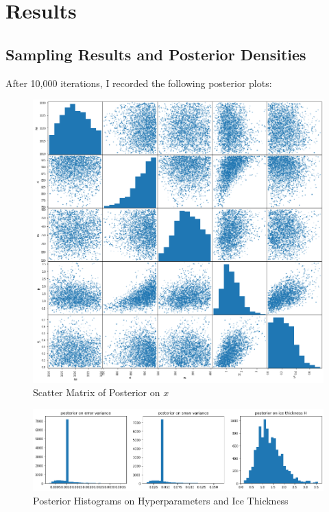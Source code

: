 \documentclass[12pt, letterpaper]{article}
\begin{document}
\newpage
\section{Results}

\subsection{Sampling Results and Posterior Densities}
After 10,000 iterations, I recorded the following posterior plots:
\begin{figure}[h]
\caption{Scatter Matrix of Posterior on $x$}
\includegraphics[width=\textwidth]{posterior_matrix.png}
\end{figure}
\begin{figure}[h]
\caption{Posterior Histograms on Hyperparameters and Ice Thickness}
\includegraphics[width=\textwidth]{posteriors.png}
\end{figure}
\end{document}
